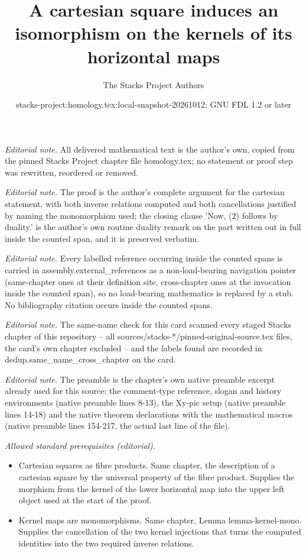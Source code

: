 \documentclass[10pt,a4paper]{amsart}
\title{A cartesian square induces an isomorphism on the kernels of its horizontal maps}
\author{The Stacks Project Authors}
\date{stacks-project:homology.tex:local-snapshot-20261012; GNU FDL 1.2 or later}
\theoremstyle{plain}
\theoremstyle{definition}
\theoremstyle{remark}
\numberwithin{equation}{subsection}
\begin{document}
\maketitle
\noindent\textit{Editorial note.} All delivered mathematical text is the author's own, copied from the pinned Stacks Project chapter file homology.tex; no statement or proof step was rewritten, reordered or removed.\par\medskip
\noindent\textit{Editorial note.} The proof is the author's complete argument for the cartesian statement, with both inverse relations computed and both cancellations justified by naming the monomorphism used; the closing clause 'Now, (2) follows by duality.' is the author's own routine duality remark on the part written out in full inside the counted span, and it is preserved verbatim.\par\medskip
\noindent\textit{Editorial note.} Every labelled reference occurring inside the counted spans is carried in assembly.external\_references as a non-load-bearing navigation pointer (same-chapter ones at their definition site, cross-chapter ones at the invocation inside the counted span), so no load-bearing mathematics is replaced by a stub. No bibliography citation occurs inside the counted spans.\par\medskip
\noindent\textit{Editorial note.} The same-name check for this card scanned every staged Stacks chapter of this repository -- all sources/stacks-*/pinned-original-source.tex files, the card's own chapter excluded -- and the labels found are recorded in dedup.same\_name\_cross\_chapter on the card.\par\medskip
\noindent\textit{Editorial note.} The preamble is the chapter's own native preamble excerpt already used for this source: the comment-type reference, slogan and history environments (native preamble lines 8-13), the Xy-pic setup (native preamble lines 14-18) and the native theorem declarations with the mathematical macros (native preamble lines 154-217, the actual last line of the file).\par\medskip
\noindent\textit{Allowed standard prerequisites (editorial).}\begin{itemize}
\item Cartesian squares as fibre products. Same chapter, the description of a cartesian square by the universal property of the fibre product. Supplies the morphism from the kernel of the lower horizontal map into the upper left object used at the start of the proof.
\item Kernel maps are monomorphisms. Same chapter, Lemma lemma-kernel-mono. Supplies the cancellation of the two kernel injections that turns the computed identities into the two required inverse relations.
\end{itemize}\medskip
\end{document}
